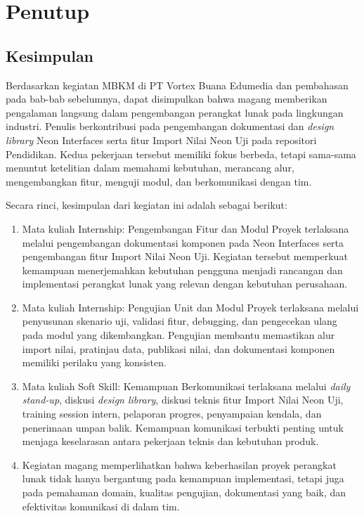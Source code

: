 \chapter{Penutup}

\section{Kesimpulan}
Berdasarkan kegiatan MBKM di PT Vortex Buana Edumedia dan pembahasan pada bab-bab sebelumnya, dapat disimpulkan bahwa magang memberikan pengalaman langsung dalam pengembangan perangkat lunak pada lingkungan industri. Penulis berkontribusi pada pengembangan dokumentasi dan \textit{design library} Neon Interfaces serta fitur Import Nilai Neon Uji pada repositori Pendidikan. Kedua pekerjaan tersebut memiliki fokus berbeda, tetapi sama-sama menuntut ketelitian dalam memahami kebutuhan, merancang alur, mengembangkan fitur, menguji modul, dan berkomunikasi dengan tim.

Secara rinci, kesimpulan dari kegiatan ini adalah sebagai berikut:
\begin{enumerate}
    \item Mata kuliah Internship: Pengembangan Fitur dan Modul Proyek terlaksana melalui pengembangan dokumentasi komponen pada Neon Interfaces serta pengembangan fitur Import Nilai Neon Uji. Kegiatan tersebut memperkuat kemampuan menerjemahkan kebutuhan pengguna menjadi rancangan dan implementasi perangkat lunak yang relevan dengan kebutuhan perusahaan.
    \item Mata kuliah Internship: Pengujian Unit dan Modul Proyek terlaksana melalui penyusunan skenario uji, validasi fitur, debugging, dan pengecekan ulang pada modul yang dikembangkan. Pengujian membantu memastikan alur import nilai, pratinjau data, publikasi nilai, dan dokumentasi komponen memiliki perilaku yang konsisten.
    \item Mata kuliah Soft Skill: Kemampuan Berkomunikasi terlaksana melalui \textit{daily stand-up}, diskusi \textit{design library}, diskusi teknis fitur Import Nilai Neon Uji, training session intern, pelaporan progres, penyampaian kendala, dan penerimaan umpan balik. Kemampuan komunikasi terbukti penting untuk menjaga keselarasan antara pekerjaan teknis dan kebutuhan produk.
    \item Kegiatan magang memperlihatkan bahwa keberhasilan proyek perangkat lunak tidak hanya bergantung pada kemampuan implementasi, tetapi juga pada pemahaman domain, kualitas pengujian, dokumentasi yang baik, dan efektivitas komunikasi di dalam tim.
\end{enumerate}

